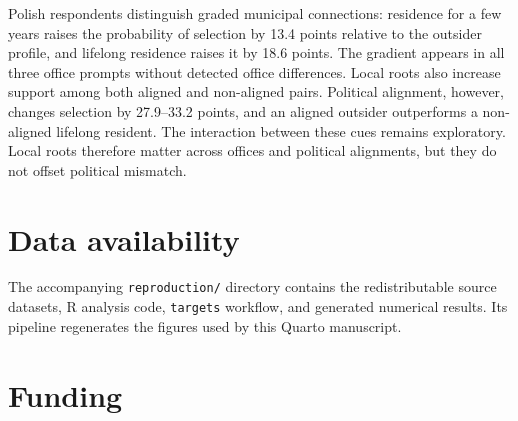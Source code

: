 \documentclass[
  letterpaper,
  DIV=11,
  numbers=noendperiod]{scrartcl}
\newcommand{\criticmarkupadd}[1]{#1}
\newcommand{\criticmarkuprm}[1]{}
\begin{document}
Polish respondents distinguish graded municipal
\criticmarkuprm{connections. The few-years-resident statement
increases}\criticmarkupadd{connections: residence for a few years raises
the probability of} selection by 13.4 points relative to the
\criticmarkuprm{outsider-with-local-knowledge statement. The
lifelong-resident statement increases
selection}\criticmarkupadd{outsider profile, and lifelong residence
raises it} by 18.6 \criticmarkuprm{points relative to the
outsider-with-local-knowledge statement. These statement contrasts
appear}\criticmarkupadd{points. The gradient appears} in all three
office prompts without
\criticmarkuprm{detectable}\criticmarkupadd{detected} office
differences. \criticmarkuprm{Yet they operate within the national
political divide. Among clearly positioned cases,}\criticmarkupadd{Local
roots also increase support among both} aligned \criticmarkuprm{profiles
gain}\criticmarkupadd{and non-aligned pairs. Political alignment,
however, changes selection by} 27.9--33.2 \criticmarkuprm{points.
An}\criticmarkupadd{points, and an} aligned \criticmarkuprm{profile with
the outsider-with-local-knowledge statement}\criticmarkupadd{outsider}
outperforms a non-aligned \criticmarkuprm{profile with the
lifelong-resident statement.}\criticmarkupadd{lifelong resident.} The
\criticmarkuprm{local and national}\criticmarkupadd{interaction between
these} cues \criticmarkuprm{coexist, while their interaction varies
across alternative weights and attitude cutoffs. The contribution is
relational: municipal embeddedness matters}\criticmarkupadd{remains
exploratory. Local roots therefore matter} across offices
\criticmarkuprm{without insulating candidate evaluation from
national}\criticmarkupadd{and} political
\criticmarkuprm{conflict.}\criticmarkupadd{alignments, but they do not
offset political mismatch.}

\section*{Data availability}\label{data-availability}

The accompanying \texttt{reproduction/} directory contains the
redistributable source datasets, R analysis code, \texttt{targets}
workflow, and generated numerical results. Its pipeline regenerates the
figures used by this Quarto manuscript.

\section*{Funding}\label{funding}
\end{document}
